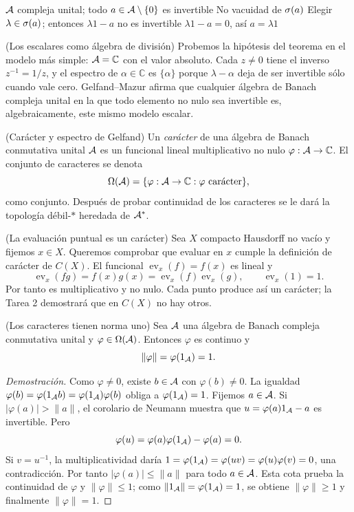 \proofdiagram
{$\mathcal A$ compleja unital; todo $a\in\mathcal A\setminus\{0\}$ es invertible}
{No vacuidad de $\sigma(a)$}
{Elegir $\lambda\in\sigma(a)$; entonces $\lambda1-a$ no es invertible}
{$\lambda1-a=0$, así $a=\lambda1$}

\begin{cthejemplo}{(Los escalares como álgebra de división)}
Probemos la hipótesis del teorema en el modelo más simple:
$\mathcal A=\mathbb C$ con el valor absoluto. Cada $z\ne0$ tiene el inverso
$z^{-1}=1/z$, y el espectro de $\alpha\in\mathbb C$ es
$\{\alpha\}$ porque $\lambda-\alpha$ deja de ser invertible sólo
cuando vale cero. Gelfand--Mazur afirma que cualquier álgebra de
Banach compleja unital en la que todo elemento no nulo sea invertible
es, algebraicamente, este mismo modelo escalar.
\end{cthejemplo}

\begin{cthdefinicion}{(Carácter y espectro de Gelfand)}
Un \emph{carácter} de una álgebra de Banach conmutativa unital $\mathcal A$ es un funcional lineal
multiplicativo no nulo $\varphi:\mathcal A\to\mathbb C$. El conjunto de caracteres se denota
\[
 \Omega(\mathcal A)=\{\varphi:\mathcal A\to\mathbb C:\varphi\text{ carácter}\},
\]
como conjunto. Después de probar continuidad de los caracteres se le dará
la topología débil-$*$ heredada de $\mathcal A^*$.
\end{cthdefinicion}

\begin{cthejemplo}{(La evaluación puntual es un carácter)}
Sea $X$ compacto Hausdorff no vacío y fijemos $x\in X$.
Queremos comprobar que evaluar en $x$ cumple la definición de carácter
de $C(X)$. El funcional $\operatorname{ev}_x(f)=f(x)$ es lineal y
\[
 \operatorname{ev}_x(fg)=f(x)g(x)
 =\operatorname{ev}_x(f)\operatorname{ev}_x(g),\qquad
 \operatorname{ev}_x(1)=1.
\]
Por tanto es multiplicativo y no nulo. Cada punto produce así un
carácter; la Tarea 2 demostrará que en $C(X)$ no hay otros.
\end{cthejemplo}

\begin{cthproposicion}{(Los caracteres tienen norma uno)}
Sea $\mathcal A$ una álgebra de Banach compleja conmutativa unital y
$\varphi\in\Omega(\mathcal A)$. Entonces $\varphi$ es continuo y
\[
 \|\varphi\|=\varphi(1_\mathcal A)=1.
\]
\end{cthproposicion}

\begin{proof}[Demostración]
Como $\varphi\ne0$, existe $b\in\mathcal A$ con $\varphi(b)\ne0$.
La igualdad $\varphi(b)=\varphi(1_\mathcal A b)=\varphi(1_\mathcal A)\varphi(b)$
obliga a $\varphi(1_\mathcal A)=1$. Fijemos $a\in\mathcal A$.
Si $|\varphi(a)|>\|a\|$, el corolario de Neumann muestra que
$u=\varphi(a)1_\mathcal A-a$ es invertible. Pero
\[
 \varphi(u)=\varphi(a)\varphi(1_\mathcal A)-\varphi(a)=0.
\]
Si $v=u^{-1}$, la multiplicatividad daría
$1=\varphi(1_\mathcal A)=\varphi(uv)=\varphi(u)\varphi(v)=0$,
una contradicción. Por tanto $|\varphi(a)|\le\|a\|$ para todo
$a\in\mathcal A$. Esta cota prueba la continuidad de $\varphi$ y
$\|\varphi\|\le1$; como $\|1_\mathcal A\|=\varphi(1_\mathcal A)=1$,
se obtiene $\|\varphi\|\ge1$ y finalmente $\|\varphi\|=1$.
\end{proof}

